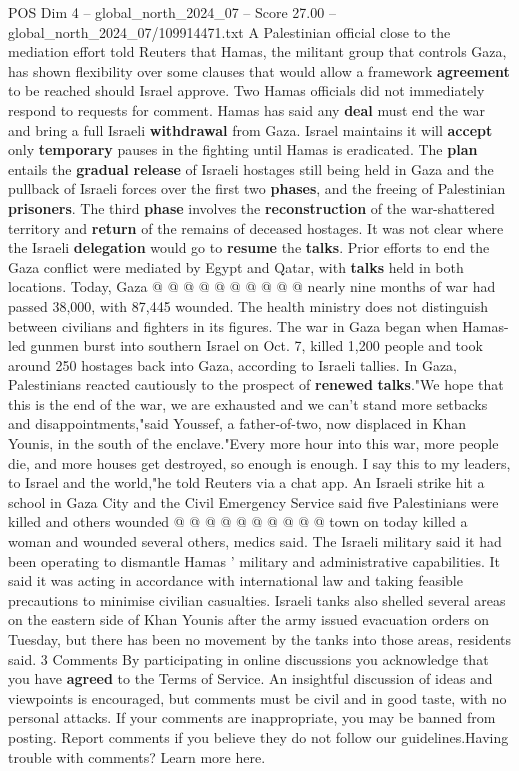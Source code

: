 \begin{textsample}{POS Dim 4 – global\_north\_2024\_07 – Score 27.00 – global\_north\_2024\_07/109914471.txt}
A Palestinian official close to the mediation effort told Reuters that Hamas, the militant group that controls Gaza, has shown flexibility over some clauses that would allow a framework \textbf{agreement} to be reached should Israel approve.
Two Hamas officials did not immediately respond to requests for comment.
Hamas has said any \textbf{deal} must end the war and bring a full Israeli \textbf{withdrawal} from Gaza.
Israel maintains it will \textbf{accept} only \textbf{temporary} pauses in the fighting until Hamas is eradicated.
The \textbf{plan} entails the \textbf{gradual} \textbf{release} of Israeli hostages still being held in Gaza and the pullback of Israeli forces over the first two \textbf{phases}, and the freeing of Palestinian \textbf{prisoners}.
The third \textbf{phase} involves the \textbf{reconstruction} of the war-shattered territory and \textbf{return} of the remains of deceased hostages.
It was not clear where the Israeli \textbf{delegation} would go to \textbf{resume} the \textbf{talks}.
Prior efforts to end the Gaza conflict were mediated by Egypt and Qatar, with \textbf{talks} held in both locations.
Today, Gaza @ @ @ @ @ @ @ @ @ @ nearly nine months of war had passed 38,000, with 87,445 wounded.
The health ministry does not distinguish between civilians and fighters in its figures.
The war in Gaza began when Hamas-led gunmen burst into southern Israel on Oct. 7, killed 1,200 people and took around 250 hostages back into Gaza, according to Israeli tallies.
In Gaza, Palestinians reacted cautiously to the prospect of \textbf{renewed} \textbf{talks}."We hope that this is the end of the war, we are exhausted and we can't stand more setbacks and disappointments,"said Youssef, a father-of-two, now displaced in Khan Younis, in the south of the enclave."Every more hour into this war, more people die, and more houses get destroyed, so enough is enough.
I say this to my leaders, to Israel and the world,"he told Reuters via a chat app.
An Israeli strike hit a school in Gaza City and the Civil Emergency Service said five Palestinians were killed and others wounded @ @ @ @ @ @ @ @ @ @ town on today killed a woman and wounded several others, medics said.
The Israeli military said it had been operating to dismantle Hamas ' military and administrative capabilities.
It said it was acting in accordance with international law and taking feasible precautions to minimise civilian casualties.
Israeli tanks also shelled several areas on the eastern side of Khan Younis after the army issued evacuation orders on Tuesday, but there has been no movement by the tanks into those areas, residents said. 3 Comments By participating in online discussions you acknowledge that you have \textbf{agreed} to the Terms of Service.
An insightful discussion of ideas and viewpoints is encouraged, but comments must be civil and in good taste, with no personal attacks.
If your comments are inappropriate, you may be banned from posting.
Report comments if you believe they do not follow our guidelines.Having trouble with comments?
Learn more here.


\end{textsample}
